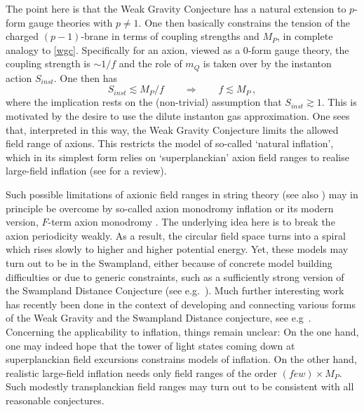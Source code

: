 \documentclass[12pt]{article}
\newcommand{\be}{\begin{equation}}
\newcommand{\ee}{\end{equation}}
\numberwithin{equation}{section}
\begin{document}
The point here is that the Weak Gravity Conjecture has a natural extension to $p$-form gauge theories with $p\neq 1$. One then basically constrains the tension of the charged $(p\!-\!1)$-brane in terms of coupling strengths and $M_P$, in complete analogy to \eqref{wgc}. Specifically for an axion, viewed as a $0$-form gauge theory, the coupling strength is $\sim 1/f$ and the role of $m_Q$ is taken over by the instanton action $S_{inst}$. One then has
\be
S_{inst}\lesssim M_P/f\qquad \Rightarrow\qquad f\lesssim
M_P\,,\label{fcon}
\ee
where the implication rests on the (non-trivial) assumption that $S_{inst}\gtrsim 1$. This is motivated by the desire to use the dilute instanton gas approximation. One sees that, interpreted in this way, the Weak Gravity Conjecture limits the allowed field range of axions. This restricts the model of so-called `natural inflation', which in its simplest form relies on `superplanckian' axion field ranges to realise large-field inflation \cite{Freese:1990rb} (see \cite{Westphal:2014ana} for a review).

Such possible limitations of axionic field ranges in string theory (see also \cite{Banks:2003sx}) may in principle be overcome by so-called axion monodromy inflation \cite{Silverstein:2008sg, McAllister:2008hb, Kaloper:2008fb, Kaloper:2011jz} or its modern version, $F$-term axion monodromy \cite{Marchesano:2014mla, Blumenhagen:2014gta, Hebecker:2014eua}. The underlying idea here is to break the axion periodicity weakly. As a result, the circular field space turns into a spiral which rises slowly to higher and higher potential energy. Yet, these models may turn out to be in the Swampland, either because of concrete model building difficulties or due to generic constraints, such as a sufficiently strong version of the Swampland Distance Conjecture (see e.g.~\cite{Baume:2016psm, Klaewer:2016kiy}). Much further interesting work has recently been done in the context of developing and connecting various forms of the Weak Gravity and the Swampland Distance conjecture, see e.g~\cite{Ibanez:2015fcv, Grimm:2018ohb, Lee:2018urn}. Concerning the applicability to inflation, things remain unclear: On the one hand, one may indeed hope that the tower of light states coming down at superplanckian field excursions constrains models of inflation. On the other hand, realistic large-field inflation needs only field ranges of the order $(few) \times M_P$. Such modestly transplanckian field ranges may turn out to be consistent with all reasonable conjectures.
\end{document}
